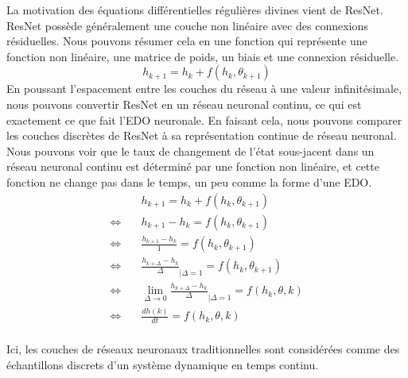 La motivation des équations différentielles régulières divines vient de ResNet. ResNet possède généralement une couche non linéaire avec des connexions résiduelles. Nous pouvons résumer cela en une fonction qui représente une fonction non linéaire, une matrice de poids, un biais et une connexion résiduelle.
\begin{equation}
    h_{k+1} = h_k + f(h_k, \theta_{k+1})
\end{equation}
En poussant l'espacement entre les couches du réseau à une valeur infinitésimale, nous pouvons convertir ResNet en un réseau neuronal continu, ce qui est exactement ce que fait l'EDO neuronale. En faisant cela, nous pouvons comparer les couches discrètes de ResNet à sa représentation continue de réseau neuronal. Nous pouvons voir que le taux de changement de l'état sous-jacent dans un réseau neuronal continu est déterminé par une fonction non linéaire, et cette fonction ne change pas dans le temps, un peu comme la forme d'une EDO.
\begin{align*}
    &h_{k+1} = h_k + f(h_k, \theta_{k+1}) \\
    \Leftrightarrow \quad &  h_{k+1} - h_k = f(h_k, \theta_{k+1}) \\
    \Leftrightarrow \quad & \frac{h_{k+1} - h_k}{1} = f(h_k, \theta_{k+1}) \\
    \Leftrightarrow \quad & \frac{h_{k+\Delta} - h_k}{\Delta}_{|\Delta=1} = f(h_k, \theta_{k+1}) \\
    \Leftrightarrow \quad & \lim_{\Delta \to 0} \frac{h_{k+\Delta} - h_k}{\Delta}_{|\Delta=1} = f(h_k, \theta, k) \\
    \Leftrightarrow \quad & \frac{dh(k)}{dt} = f(h_k, \theta, k) \\
\end{align*}

Ici, les couches de réseaux neuronaux traditionnelles sont considérées comme des échantillons discrets d'un système dynamique en temps continu.


